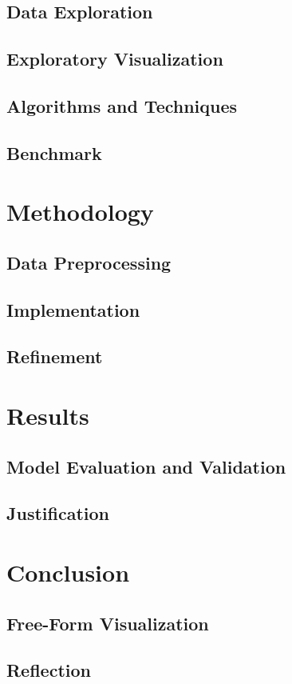 \documentclass[12pt]{article}
\begin{document}
\subsection{Data Exploration}
\subsection{Exploratory Visualization}
\subsection{Algorithms and Techniques}
\subsection{Benchmark}
\section{Methodology}
\subsection{Data Preprocessing}
\subsection{Implementation}
\subsection{Refinement}
\section{Results}
\subsection{Model Evaluation and Validation}
\subsection{Justification}
\section{Conclusion}
\subsection{Free-Form Visualization}
\subsection{Reflection}
\end{document}
